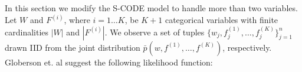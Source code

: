 \label{app:multiscode}
In this section we modify the S-CODE model to handle more than two variables. 
Let $W$ and $F^{(i)}$, where $i=1\ldots K$, be $K+1$ categorical
variables with finite cardinalities $|W|$ and $|F^{(i)}|$.  We observe a set of
tuples $\{w_j, f^{(1)}_j, \hdots, f^{(K)}_j\}_{j=1}^n$ drawn IID from the joint
distribution $\bar{p}(w, f^{(1)}, \hdots, f^{(K)})$, respectively.
Globerson et.  al  suggest the following
likelihood function:

